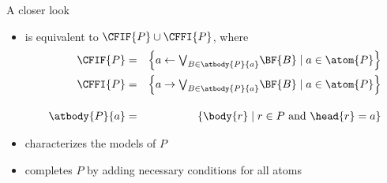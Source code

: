 \begin{frame}{A closer look}
  \bigskip
  \begin{itemize}
  \item {} is equivalent to $\CFIF{P}\cup\CFFI{P}$,
    where
    \begin{eqnarray*}
      \CFIF{P}
      & = &
      \left\{a \leftarrow \textstyle{\bigvee_{B\in\atbody{P}{a}}} \BF{B} \mid a\in\atom{P}\right\}
      \\
      \CFFI{P}
      & = &
      \left\{a \rightarrow \textstyle{\bigvee_{B\in\atbody{P}{a}}} \BF{B} \mid a\in\atom{P}\right\}
      \\[10pt]
      \atbody{P}{a}
      & = &
      \left\{\body{r} \mid r\in P\text{ and }\head{r}=a\right\}
    \end{eqnarray*}
    \smallskip
  \item<2->  characterizes the models of $P$
    \smallskip
  \item<2->  completes $P$ by adding necessary conditions for all atoms
\end{itemize}
\end{frame}
